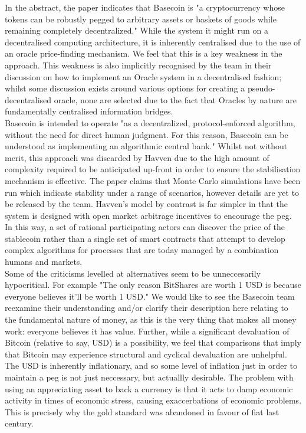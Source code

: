 \documentclass{article}
\begin{document}
\noindent In the abstract, the paper indicates that Basecoin is  "a cryptocurrency whose tokens can be robustly pegged to arbitrary assets or baskets of goods while remaining completely decentralized." While the system it might run on a decentralised computing architecture, it is inherently centralised due to the use of an oracle price-finding mechanism. We feel that this is a key weakness in the approach. This weakness is also implicitly recognised by the team in their discussion on how to implement an Oracle system in a decentralised fashion; whilst some discussion exists around various options for creating a pseudo-decentralised oracle, none are selected due to the fact that Oracles by nature are fundamentally centralised information bridges. \\

\noindent Basecoin is intended to operate "as a decentralized, protocol-enforced algorithm, without the need for direct human judgment. For this reason, Basecoin can be understood as implementing an algorithmic central bank." Whilst not without merit, this approach was discarded by Havven due to the high amount of complexity required to be anticipated up-front in order to ensure the stabilisation mechanism is effective. The paper claims that Monte Carlo simulations have been run which indicate stability under a range of scenarios, however details are yet to be released by the team. Havven's model by contrast is far simpler in that the system is designed with open market arbitrage incentives to encourage the peg. In this way, a set of rational participating actors can discover the price of the stablecoin rather than a single set of smart contracts that attempt to develop complex algorithms for processes that are today managed by a combination humans and markets. \\

\noindent Some of the criticisms levelled at alternatives seem to be unneccesarily hypocritical. For example "The only reason BitShares are worth 1 USD is because everyone believes it’ll be worth 1 USD." We would like to see the Basecoin team  reexamine their understanding and/or clarify their description here relating to the fundamental nature of money, as this is the very thing that makes all money work: everyone believes it has value. Further, while a significant devaluation of Bitcoin (relative to say, USD) is a possibility, we feel that comparisons that imply that Bitcoin may experience structural and cyclical devaluation are unhelpful. The USD is inherently inflationary, and so some level of inflation just in order to maintain a peg is not just neccessary, but actuallly desirable. The problem with using an appreciating asset to back a currency is that it acts to damp economic activity in times of economic stress, causing exaccerbations of economic problems. This is precisely why the gold standard was abandoned in favour of fiat last century. \\
\end{document}
